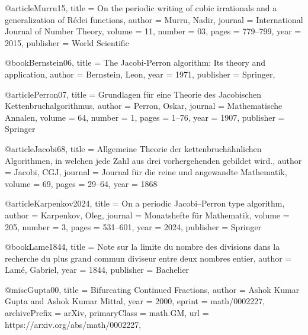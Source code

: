\documentclass[english,version-2020-11]{uzl-thesis}
\begin{document}










\begin{bibtex-entries}
@article{Murru15,
  title     = {On the periodic writing of cubic irrationals and a generalization of R{\'e}dei functions},
  author    = {Murru, Nadir},
  journal   = {International Journal of Number Theory},
  volume    = {11},
  number    = {03},
  pages     = {779--799},
  year      = {2015},
  publisher = {World Scientific}
}

@book{Bernstein06,
  title     = {The Jacobi-Perron algorithm: Its theory and application},
  author    = {Bernstein, Leon},
  year      = {1971},
  publisher = {Springer},
}

@article{Perron07,
  title     = {Grundlagen f{\"u}r eine Theorie des Jacobischen Kettenbruchalgorithmus},
  author    = {Perron, Oskar},
  journal   = {Mathematische Annalen},
  volume    = {64},
  number    = {1},
  pages     = {1--76},
  year      = {1907},
  publisher = {Springer}
}

@article{Jacobi68,
  title   = {Allgemeine Theorie der kettenbruch{\"a}hnlichen Algorithmen, in welchen jede Zahl aus drei vorhergehenden gebildet wird.},
  author  = {Jacobi, CGJ},
  journal = {Journal f{\"u}r die reine und angewandte Mathematik},
  volume  = {69},
  pages   = {29--64},
  year    = {1868}
}

@article{Karpenkov2024,
  title     = {On a periodic Jacobi--Perron type algorithm},
  author    = {Karpenkov, Oleg},
  journal   = {Monatshefte f{\"u}r Mathematik},
  volume    = {205},
  number    = {3},
  pages     = {531--601},
  year      = {2024},
  publisher = {Springer}
}

@book{Lame1844,
  title     = {Note sur la limite du nombre des divisions dans la recherche du plus grand commun diviseur entre deux nombres entier},
  author    = {Lam{\'e}, Gabriel},
  year      = {1844},
  publisher = {Bachelier}
}

@misc{Gupta00,
  title         = {Bifurcating Continued Fractions},
  author        = {Ashok Kumar Gupta and Ashok Kumar Mittal},
  year          = {2000},
  eprint        = {math/0002227},
  archivePrefix = {arXiv},
  primaryClass  = {math.GM},
  url           = {https://arxiv.org/abs/math/0002227},
}
\end{bibtex-entries}
\end{document}
